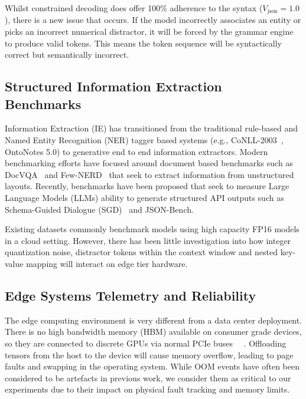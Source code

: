 \documentclass[conference]{IEEEtran}
\begin{document}
Whilst constrained decoding does offer 100\% adherence to the syntax ($V_{\text{json}} = 1.0$), there is a new issue that occurs. If the model incorrectly associates an entity or picks an incorrect numerical distractor, it will be forced by the grammar engine to produce valid tokens. This means the token sequence will be syntactically correct but semantically incorrect.

\subsection{Structured Information Extraction Benchmarks}
Information Extraction (IE) has transitioned from the traditional rule-based and Named Entity Recognition (NER) tagger based systems (e.g., CoNLL-2003~\cite{tjong2003conll}, OntoNotes 5.0) to generative end to end information extractors. Modern benchmarking efforts have focused around document based benchmarks such as DocVQA~\cite{mathew2021docvqa} and Few-NERD~\cite{ding2021fewnerd} that seek to extract information from unstructured layouts. Recently, benchmarks have been proposed that seek to measure Large Language Models (LLMs) ability to generate structured API outputs such as Schema-Guided Dialogue (SGD)~\cite{rastogi2020towards} and JSON-Bench.

Existing datasets commonly benchmark models using high capacity FP16 models in a cloud setting. However, there has been little investigation into how integer quantization noise, distractor tokens within the context window and nested key-value mapping will interact on edge tier hardware.

\subsection{Edge Systems Telemetry and Reliability}
The edge computing environment is very different from a data center deployment. There is no high bandwidth memory (HBM) available on consumer grade devices, so they are connected to discrete GPUs via normal PCIe buses ~\cite{liu2024edge}~\cite{ding2024slm_edge}. Offloading tensors from the host to the device will cause memory overflow, leading to page faults and swapping in the operating system. While OOM events have often been considered to be artefacts in previous work, we consider them as critical to our experiments due to their impact on physical fault tracking and memory limits.

\end{document}
